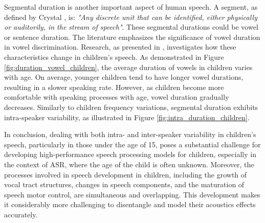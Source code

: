 Segmental duration is another important aspect of human speech. A segment, as defined by Crystal \cite{segment_definition}, is: \textit{"Any discrete unit that can be identified, either physically or auditorily, in the stream of speech"}. These segmental durations could be vowel or sentence duration. The literature emphasizes the significance of vowel duration in vowel discrimination. Research, as presented in \cite{Acoustic_change_children}, investigates how these characteristics change in children's speech. As demonstrated in Figure \ref{fig:duration_vowel_children}, the average duration of vowels in children varies with age. On average, younger children tend to have longer vowel durations, resulting in a slower speaking rate. However, as children become more comfortable with speaking processes with age, vowel duration gradually decreases. Similarly to children frequency variations, segmental duration exhibits intra-speaker variability, as illustrated in Figure \ref{fig:intra_duration_children}.

In conclusion, dealing with both intra- and inter-speaker variability in children's speech, particularly in those under the age of 15, poses a substantial challenge for developing high-performance speech processing models for children, especially in the context of ASR, where the age of the child is often unknown. Moreover, the processes involved in speech development in children, including the growth of vocal tract structures, changes in speech components, and the maturation of speech motor control, are simultaneous and overlapping. This development makes it considerably more challenging to disentangle and model their acoustics effects accurately.



